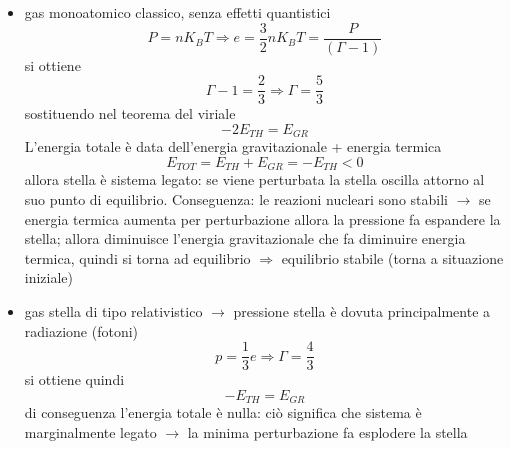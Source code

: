 \documentclass[a4paper,11pt]{report}
\theoremstyle{remark}
\theoremstyle{definition}
\begin{document}
\begin{itemize}
    \item gas monoatomico classico, senza effetti quantistici
    \begin{equation*}
        P = n K_B T \Rightarrow e = \frac{3}{2}n K_B T = \frac{P}{(\Gamma - 1)}
    \end{equation*}
    si ottiene
    \begin{equation*}
        \Gamma - 1 = \frac{2}{3} \Rightarrow \Gamma = \frac{5}{3}
    \end{equation*}
    sostituendo nel teorema del viriale
    \begin{equation*}
        -2 E_{TH} = E_{GR}
    \end{equation*}
    L'energia totale è data dell'energia gravitazionale + energia termica
    \begin{equation*}
        E_{TOT} = E_{TH} + E_{GR} = -E_{TH} < 0
    \end{equation*}
    allora stella è sistema legato: se viene perturbata la stella oscilla attorno al suo punto di equilibrio. Conseguenza: le reazioni nucleari sono stabili $\rightarrow$ se energia termica aumenta per perturbazione allora la pressione fa espandere la stella; allora diminuisce l'energia gravitazionale che fa diminuire energia termica, quindi si torna ad equilibrio $\Rightarrow$ equilibrio stabile (torna a situazione iniziale)
    \item gas stella di tipo relativistico $\rightarrow$ pressione stella è dovuta principalmente a radiazione (fotoni)
    \begin{equation*}
        p = \frac{1}{3} e \Rightarrow \Gamma = \frac{4}{3}
    \end{equation*}
    si ottiene quindi 
    \begin{equation*}
        -E_{TH} = E_{GR}
    \end{equation*}
    di conseguenza l'energia totale è nulla: ciò significa che sistema è marginalmente legato $\rightarrow$ la minima perturbazione fa esplodere la stella
\end{itemize}
\end{document}
